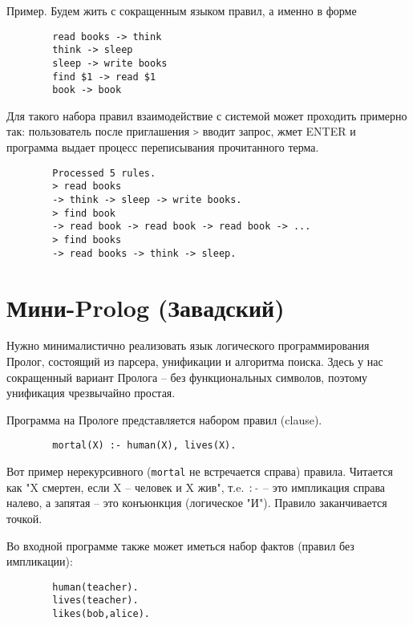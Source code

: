 \documentclass[a4paper,14pt]{article}
\def\hsinline{\lstinline[language=haskell]}
\begin{document}
Пример. Будем жить с сокращенным языком правил, а именно в форме 

\begin{lstlisting}
        read books -> think
        think -> sleep
        sleep -> write books
        find $1 -> read $1
        book -> book 
\end{lstlisting}
Для такого набора правил взаимодействие с системой может проходить примерно так: пользователь после приглашения \hsinline=>= вводит запрос, жмет ENTER и программа выдает процесс переписывания прочитанного терма.
\begin{lstlisting}
        Processed 5 rules.
        > read books
        -> think -> sleep -> write books. 
        > find book
        -> read book -> read book -> read book -> ...
        > find books 
        -> read books -> think -> sleep. 
\end{lstlisting}



\section{Мини-Prolog (Завадский)}

Нужно минималистично реализовать язык логического программирования Пролог, состоящий из парсера, унификации и алгоритма поиска. Здесь у нас сокращенный вариант Пролога -- без функциональных символов, поэтому унификация чрезвычайно простая.

Программа на Прологе представляется набором правил (clause).

\begin{lstlisting}
        mortal(X) :- human(X), lives(X). 
\end{lstlisting}

Вот пример нерекурсивного (\hsinline=mortal= не встречается справа) правила. Читается как "X смертен, если X -- человек и X жив", т.e. \hsinline=:-= -- это импликация справа налево, а запятая -- это конъюнкция (логическое "И"). Правило заканчивается точкой. 

Во входной программе также может иметься набор фактов (правил без импликации):

\begin{lstlisting}
        human(teacher).
        lives(teacher).
        likes(bob,alice).
\end{lstlisting}
\end{document}
